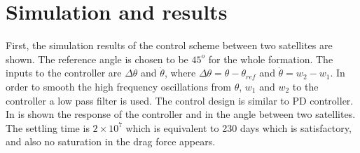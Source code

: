 \section{Simulation and results}
 First, the simulation results of the control scheme between two satellites are shown. The reference angle is chosen to be $45^{o}$ for the whole formation. The inputs to the controller are $\Delta\theta$ and $\dot{\theta}$, where $\Delta\theta = \theta - \theta_{ref}$ and $\dot{\theta} = w_2 - w_1$. In order to smooth the high frequency  oscillations from $\theta$, $w_1$ and $w_2$ to the controller a low pass filter is used. The control design is similar to PD controller. In  is shown the response of the controller and in  the angle between two satellites. The settling time is $2\times10^7$ which is equivalent to 230 days which is satisfactory, and also no saturation in the drag force appears.
